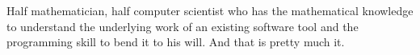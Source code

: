 

\begin{cvparagraph}

Half mathematician, half computer scientist who has the mathematical knowledge to understand the underlying work of an existing software tool and the programming skill to bend it to his will. And that is pretty much it.
\end{cvparagraph}